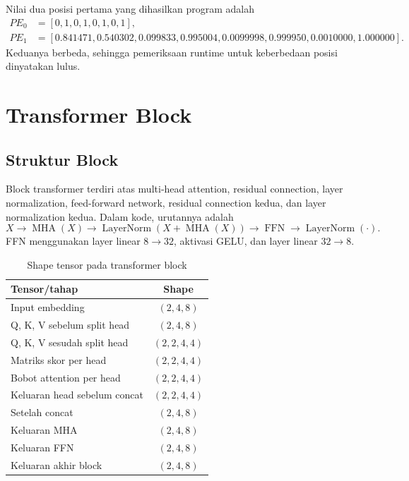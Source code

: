 \documentclass[12pt,a4paper]{article}
\begin{document}
Nilai dua posisi pertama yang dihasilkan program adalah
\[
\begin{aligned}
PE_0 &= [0,1,0,1,0,1,0,1],\\
PE_1 &= [0.841471,0.540302,0.099833,0.995004,
0.0099998,0.999950,0.0010000,1.000000].
\end{aligned}
\]
Keduanya berbeda, sehingga pemeriksaan runtime untuk keberbedaan posisi
dinyatakan lulus.

\section{Transformer Block}

\subsection{Struktur Block}
Block transformer terdiri atas multi-head attention, residual connection,
layer normalization, feed-forward network, residual connection kedua, dan
layer normalization kedua.
Dalam kode, urutannya adalah
\[
X \longrightarrow \operatorname{MHA}(X)
\longrightarrow \operatorname{LayerNorm}(X+\operatorname{MHA}(X))
\longrightarrow \operatorname{FFN}
\longrightarrow \operatorname{LayerNorm}(\cdot).
\]
FFN menggunakan layer linear $8\rightarrow32$, aktivasi GELU, dan layer linear
$32\rightarrow8$.

\begin{table}[H]
    \centering
    \caption{Shape tensor pada transformer block}
    \label{tab:shapes}
    \renewcommand{\arraystretch}{1.2}
    \begin{tabular}{l c}
        \toprule
        Tensor/tahap & Shape \\
        \midrule
        Input embedding & $(2,4,8)$ \\
        Q, K, V sebelum split head & $(2,4,8)$ \\
        Q, K, V sesudah split head & $(2,2,4,4)$ \\
        Matriks skor per head & $(2,2,4,4)$ \\
        Bobot attention per head & $(2,2,4,4)$ \\
        Keluaran head sebelum concat & $(2,2,4,4)$ \\
        Setelah concat & $(2,4,8)$ \\
        Keluaran MHA & $(2,4,8)$ \\
        Keluaran FFN & $(2,4,8)$ \\
        Keluaran akhir block & $(2,4,8)$ \\
        \bottomrule
    \end{tabular}
\end{table}
\end{document}
